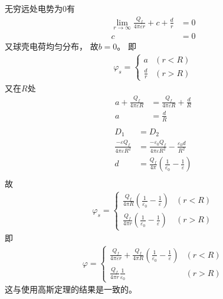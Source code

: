 \documentclass{phyasgn}
\begin{document}
\begin{sol}[2]
  无穷远处电势为0有
  \begin{align*}
    \lim_{r\to\infty}\frac{Q_f}{4\pi\varepsilon r}+c+\frac{d}{r}&=0\\
    c&=0
  \end{align*}
  又球壳电荷均匀分布，
  故$b=0$。
  即
  \begin{align*}
    \varphi_s=\left\{\begin{matrix}
      a&(r<R)\\
      \frac{d}{r}&(r>R)
    \end{matrix}\right.
  \end{align*}
  又在$R$处
  \begin{align*}
    a+\frac{Q_f}{4\pi\varepsilon R}&=\frac{Q_f}{4\pi\varepsilon R}+\frac{d}{R}\\
    a&=\frac{d}{R}\\
  \end{align*}
  \begin{align*}
    D_1&=D_2\\
    \frac{-\varepsilon Q_f}{4\pi\varepsilon R^2}&=\frac{-\varepsilon_0Q_f}{4\pi\varepsilon R^2}-\frac{\varepsilon_0d}{R^2}\\
    d&=\frac{ Q_f}{4\pi }(\frac{1}{\varepsilon_0}-\frac{1}{\varepsilon})\\
  \end{align*}
  故
  \begin{align*}
    \varphi_s=\left\{\begin{matrix}
      \frac{ Q_f}{4\pi R }(\frac{1}{\varepsilon_0}-\frac{1}{\varepsilon})&(r<R)\\
      \frac{Q_f}{4\pi r}(\frac{1}{\varepsilon_0}-\frac{1}{\varepsilon})&(r>R)
    \end{matrix}\right.
  \end{align*}
  即
  \begin{align*}
    \varphi=\left\{\begin{matrix}
      \frac{Q_f}{4\pi\varepsilon r}+\frac{ Q_f}{4\pi R }(\frac{1}{\varepsilon_0}-\frac{1}{\varepsilon})&(r<R)\\
      \frac{Q_f}{4\pi r}\frac{1}{\varepsilon_0}&(r>R)
    \end{matrix}\right.
  \end{align*}
  这与使用高斯定理的结果是一致的。
\end{sol}\par
\end{document}
